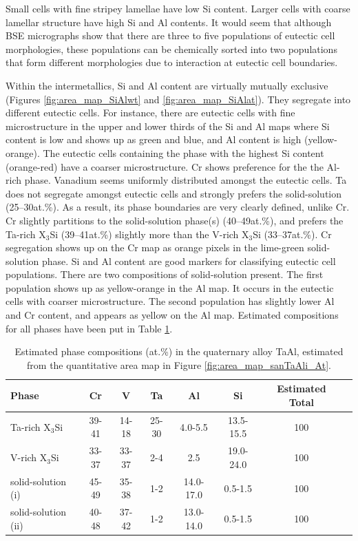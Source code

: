 Small cells with fine stripey lamellae have low Si content.  Larger cells with coarse lamellar structure have high Si and Al contents.  It would seem that although BSE micrographs show that there are three to five populations of eutectic cell morphologies, these populations can be chemically sorted into two populations that form different morphologies due to interaction at eutectic cell boundaries.  

Within the intermetallics, Si and Al content are virtually mutually exclusive (Figures \ref{fig:area_map_SiAlwt} and \ref{fig:area_map_SiAlat}).  They segregate into different eutectic cells.  For instance, there are eutectic cells with fine microstructure in the upper and lower thirds of the Si and Al maps where Si content is low and shows up as green and blue, and Al content is high (yellow-orange).  The eutectic cells containing the phase with the highest Si content (orange-red) have a coarser microstructure.  Cr shows preference for the the Al-rich phase.  Vanadium seems uniformly distributed amongst the eutectic cells.  Ta does not segregate amongst eutectic cells and strongly prefers the solid-solution (25--30at.\%).  As a result, its phase boundaries are very clearly defined, unlike Cr.  Cr slightly partitions to the solid-solution phase(s) (40--49at.\%), and prefers the Ta-rich X$_3$Si (39--41at.\%) slightly more than the V-rich X$_3$Si (33--37at.\%).  Cr segregation shows up on the Cr map as orange pixels in the lime-green solid-solution phase.  Si and Al content are good markers for classifying eutectic cell populations.  There are two compositions of solid-solution present.  The first population shows up as yellow-orange in the Al map.  It occurs in the eutectic cells with coarser microstructure.  The second population has slightly lower Al and Cr content, and appears as yellow on the Al map.  Estimated compositions for all phases have been put in Table \ref{tab:sanTaAl}.

%
\begin{table}[htdp]
\begin{center}
\begin{tabular}{lccccccc}
\hline\hline
Phase 				&   Cr    	&  	V   			&  Ta  		&   Al     			& Si   			& Estimated Total\\
\hline
Ta-rich X$_3$Si		&	39-41	&	14-18		&	25-30	&	4.0-5.5		&	13.5-15.5	&	100	\\
V-rich X$_3$Si			&	33-37	&	33-37		&	2-4	&	2.5		&	19.0-24.0	&	100	\\ 
solid-solution (i)		&	45-49	&		35-38	&  1-2		&	14.0-17.0		&	0.5-1.5	&	100	\\
solid-solution (ii)		&	40-48	&		37-42	&	1-2	&	13.0-14.0		&	 0.5-1.5	&	100	\\

\hline\hline
\end{tabular}
\end{center}
\caption{Estimated phase compositions (at.\%) in the quaternary alloy TaAl, estimated from the quantitative area map in Figure \ref{fig:area_map_sanTaAli_At}.}
\label{tab:sanTaAl}
\end{table}
%

